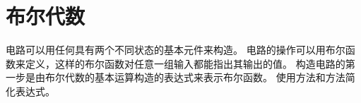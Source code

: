 
\chapter{布尔代数}
{
    电路可以用任何具有两个不同状态的基本元件来构造。
    电路的操作可以用布尔函数来定义，这样的布尔函数对任意一组输入都能指出其输出的值。
    构造电路的第一步是由布尔代数的基本运算构造的表达式来表示布尔函数。
    使用方法和方法简化表达式。

    
    
    
}

\cleardoublepage

\endinput
